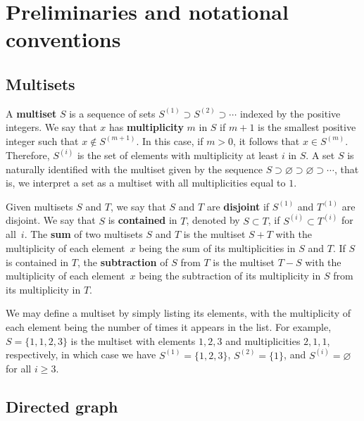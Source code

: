 \documentclass[11pt]{article}
\theoremstyle{definition}
\numberwithin{equation}{section}
\newcommand{\vocab}[1]{\textbf{#1}}
\newcommand{\mtp}[1]{^{(#1)}} \newcommand{\graph}{\varGamma}
\begin{document}
\section{Preliminaries and notational conventions} \label{section:preliminaries}

\subsection{Multisets} \label{subsection:multisets}

A \vocab{multiset} \(S\) is a sequence of sets \(S\mtp{1} \supset S\mtp{2} \supset \cdots\) indexed by the positive integers.
We say that \(x\) has \vocab{multiplicity} \(m\) in \(S\) if \(m+1\) is the smallest positive integer such that \(x \notin S\mtp{m+1}\).
In this case, if \(m > 0\), it follows that \(x \in S\mtp{m}\).
Therefore, \(S\mtp{i}\) is the set of elements with multiplicity at least \(i\) in \(S\).
A set \(S\) is naturally identified with the multiset given by the sequence \(S \supset \varnothing \supset \varnothing \supset \cdots\), that is, we interpret a set as a multiset with all multiplicities equal to \(1\).

Given multisets \(S\) and \(T\), we say that \(S\) and \(T\) are \vocab{disjoint} if \(S\mtp{1}\) and \(T\mtp{1}\) are disjoint.
We say that \(S\) is \vocab{contained} in \(T\), denoted by \(S \subset T\), if \(S\mtp{i} \subset T\mtp{i}\) for all~\(i\).
The \vocab{sum} of two multisets \(S\) and \(T\) is the multiset \(S + T\) with the multiplicity of each element~\(x\) being the sum of its multiplicities in \(S\) and \(T\).
If \(S\) is contained in \(T\), the \vocab{subtraction} of \(S\) from \(T\) is the multiset \(T - S\) with the multiplicity of each element~\(x\) being the subtraction of its multiplicity in \(S\) from its multiplicity in \(T\).

We may define a multiset by simply listing its elements, with the multiplicity of each element being the number of times it appears in the list.
For example, \(S = \{1, 1, 2, 3\}\) is the multiset with elements \(1, 2, 3\) and multiplicities \(2, 1, 1\), respectively, in which case we have \(S\mtp{1} = \{1, 2, 3\}\), \(S\mtp{2} = \{1\}\), and \(S\mtp{i} = \varnothing\) for all \(i \geq 3\).

\subsection{Directed graph} \label{subsection:directedgraph}
\end{document}
